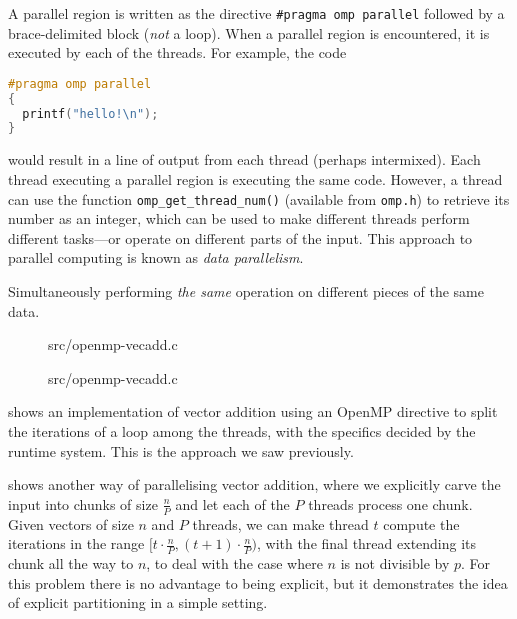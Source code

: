 A parallel region is written as the directive \texttt{\#pragma omp
  parallel} followed by a brace-delimited block (\emph{not} a loop).
When a parallel region is encountered, it is executed by each of the
threads. For example, the code
\begin{lstlisting}[language=C]
#pragma omp parallel
{
  printf("hello!\n");
}
\end{lstlisting}
would result in a line of output from each thread (perhaps
intermixed). Each thread executing a parallel region is executing the
same code. However, a thread can use the function
\texttt{omp\_get\_thread\_num()} (available from \texttt{omp.h}) to
retrieve its number as an integer, which can be used to make different
threads perform different tasks---or operate on different parts of the
input. This approach to parallel computing is known as \emph{data
  parallelism}.

\begin{definition}
  Simultaneously performing \textit{the same} operation on different
  pieces of the same data.
\end{definition}

\begin{figure}

{src/openmp-vecadd.c}
\end{figure}

\begin{figure}

{src/openmp-vecadd.c}
\end{figure}


 shows an implementation of vector
addition using an OpenMP directive to split the iterations of a loop
among the threads, with the specifics decided by the runtime system.
This is the approach we saw previously.

 shows another way of parallelising
vector addition, where we explicitly carve the input into chunks of
size $\frac{n}{P}$ and let each of the $P$ threads process one chunk.
Given vectors of size $n$ and $P$ threads, we can make thread $t$
compute the iterations in the range
$[t\cdot \frac{n}{P},(t+1)\cdot \frac{n}{P})$, with the final thread
extending its chunk all the way to $n$, to deal with the case where
$n$ is not divisible by $p$. For this problem there is no advantage to
being explicit, but it demonstrates the idea of explicit partitioning
in a simple setting.

